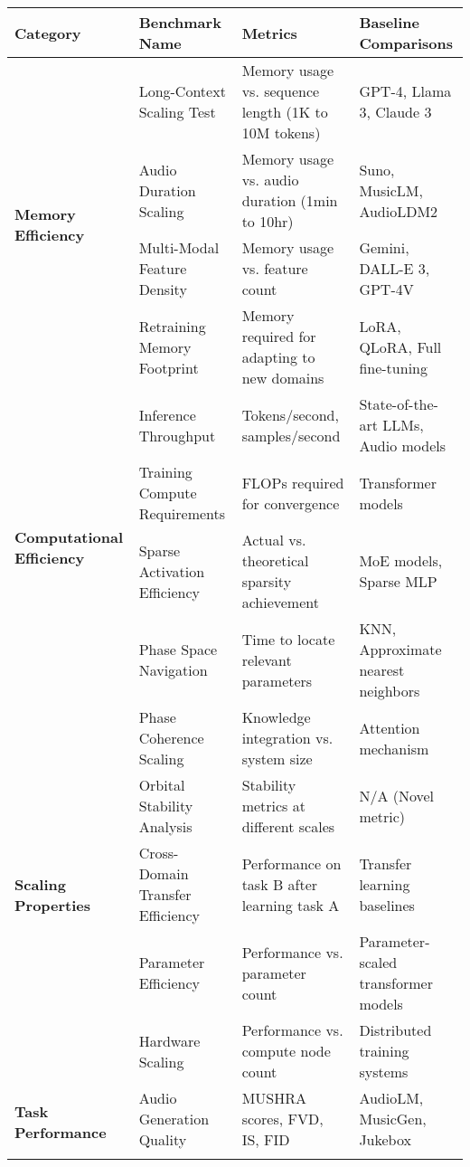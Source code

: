 \begin{table}[h]
\centering
\small
\begin{tabular}{|p{3cm}|p{4cm}|p{4cm}|p{3cm}|}
\hline
\textbf{Category} & \textbf{Benchmark Name} & \textbf{Metrics} & \textbf{Baseline Comparisons} \\
\hline
\multirow{4}{3cm}{\textbf{Memory Efficiency}} & 
Long-Context Scaling Test & Memory usage vs. sequence length (1K to 10M tokens) & GPT-4, Llama 3, Claude 3 \\
\cline{2-4}
& Audio Duration Scaling & Memory usage vs. audio duration (1min to 10hr) & Suno, MusicLM, AudioLDM2 \\
\cline{2-4}
& Multi-Modal Feature Density & Memory usage vs. feature count & Gemini, DALL-E 3, GPT-4V \\
\cline{2-4}
& Retraining Memory Footprint & Memory required for adapting to new domains & LoRA, QLoRA, Full fine-tuning \\
\hline
\multirow{4}{3cm}{\textbf{Computational Efficiency}} & 
Inference Throughput & Tokens/second, samples/second & State-of-the-art LLMs, Audio models \\
\cline{2-4}
& Training Compute Requirements & FLOPs required for convergence & Transformer models \\
\cline{2-4}
& Sparse Activation Efficiency & Actual vs. theoretical sparsity achievement & MoE models, Sparse MLP \\
\cline{2-4}
& Phase Space Navigation & Time to locate relevant parameters & KNN, Approximate nearest neighbors \\
\hline
\multirow{5}{3cm}{\textbf{Scaling Properties}} & 
Phase Coherence Scaling & Knowledge integration vs. system size & Attention mechanism \\
\cline{2-4}
& Orbital Stability Analysis & Stability metrics at different scales & N/A (Novel metric) \\
\cline{2-4}
& Cross-Domain Transfer Efficiency & Performance on task B after learning task A & Transfer learning baselines \\
\cline{2-4}
& Parameter Efficiency & Performance vs. parameter count & Parameter-scaled transformer models \\
\cline{2-4}
& Hardware Scaling & Performance vs. compute node count & Distributed training systems \\
\hline
\multirow{6}{3cm}{\textbf{Task Performance}} & 
Audio Generation Quality & MUSHRA scores, FVD, IS, FID & AudioLM, MusicGen, Jukebox \\
\cline{2-4}

\end{tabular}
\end{table}
